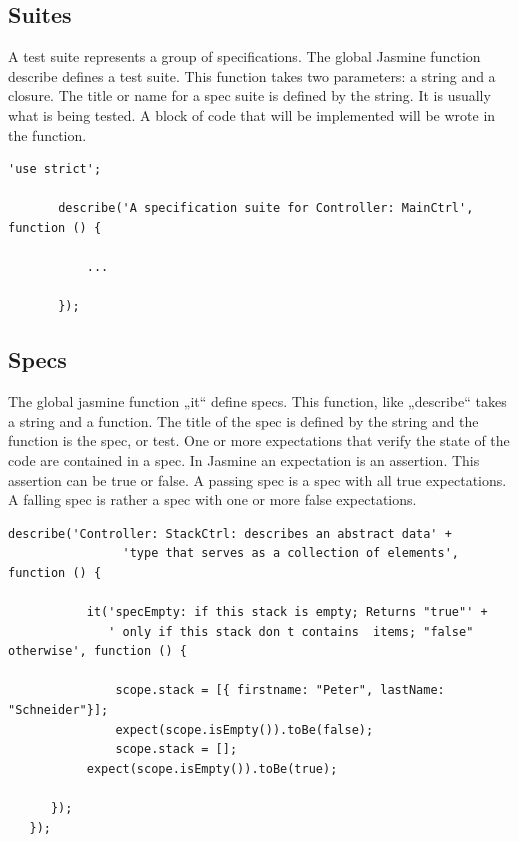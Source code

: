 \documentclass[11pt]{article}
\begin{document}
\subsection{Suites}

A test suite represents a group of specifications. The global Jasmine function describe defines a test suite. This function takes two parameters: a string and a closure. The title or name for a spec suite is defined by the string. It is usually what is being tested. A block of code that will be implemented will be wrote in the function.

\pagebreak

\begin{lstlisting}[caption=Suites example]
       'use strict';  
         
       describe('A specification suite for Controller: MainCtrl', function () {  
         
           ...  
         
       });  
\end{lstlisting}

\subsection{Specs}

The global jasmine function „it“ define specs. This function, like „describe“ takes a string and a function. The title of the spec is defined by the string and the function is the spec, or test. One or more expectations that verify the state of the code are contained in a spec. In Jasmine an expectation is an assertion. This assertion can be true or false. A passing spec is a spec with all true expectations. A falling spec is rather a spec with one or more false expectations. 

\begin{lstlisting}[caption=Specs example]
       describe('Controller: StackCtrl: describes an abstract data' +  
                'type that serves as a collection of elements', function () {  
            
           it('specEmpty: if this stack is empty; Returns "true"' +  
              ' only if this stack don t contains  items; "false" otherwise', function () {  
         
               scope.stack = [{ firstname: "Peter", lastName: "Schneider"}];  
               expect(scope.isEmpty()).toBe(false);  
               scope.stack = [];  
           expect(scope.isEmpty()).toBe(true);      
         
      });  
   });  
\end{lstlisting}
\end{document}
